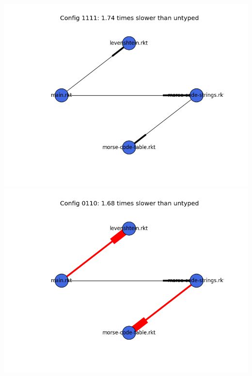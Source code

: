\documentclass{article}
\begin{document}
\begin{itemize}
\includegraphics[width=\textwidth]{morse-code-module-graph-1111.png}
\includegraphics[width=\textwidth]{morse-code-module-graph-0110.png}
\end{itemize}
\end{document}
